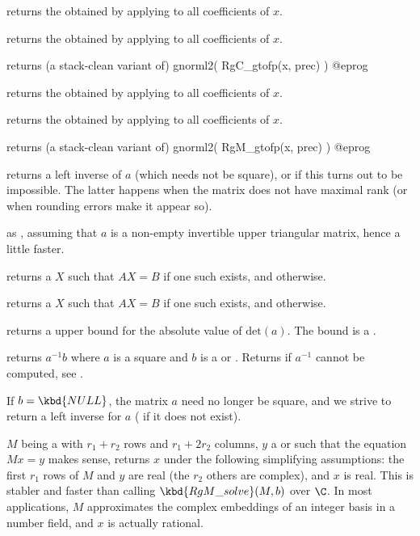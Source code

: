  returns the  obtained by
applying  to all coefficients of $x$.

 returns the  obtained by
applying  to all coefficients of $x$.

 returns (a stack-clean variant of)
\bprog
  gnorml2( RgC_gtofp(x, prec) )
@eprog

 returns the  obtained by
applying  to all coefficients of $x$.

 returns the  obtained by
applying  to all coefficients of $x$.

 returns (a stack-clean variant of)
\bprog
  gnorml2( RgM_gtofp(x, prec) )
@eprog


 returns a left inverse of $a$ (which needs not be
square), or  if this turns out to be impossible. The latter
happens when the matrix does not have maximal rank (or when rounding errors
make it appear so).

 as , assuming that $a$ is a
non-empty invertible upper triangular matrix, hence a little faster.

 returns a  $X$ such that
$A X = B$ if one such exists, and  otherwise.

 returns a  $X$ such that
$A X = B$ if one such exists, and  otherwise.

 returns a upper bound for the absolute
value of $\text{det}(a)$. The bound is a .

 returns $a^{-1}b$ where $a$ is a square
 and $b$ is a  or . Returns  if $a^{-1}$
cannot be computed, see .

If $b = \kbd{NULL}$, the matrix $a$ need no longer be square, and we strive
to return a left inverse for $a$ ( if it does not exist).

 $M$ being a 
with $r_1+r_2$ rows and $r_1+2r_2$ columns, $y$ a  or 
such that the equation $Mx = y$ makes sense, returns $x$ under the following
simplifying assumptions: the first $r_1$ rows of $M$ and $y$ are real
(the $r_2$ others are complex), and $x$ is real. This is stabler and faster
than calling $\kbd{RgM\_solve}(M, b)$ over $\C$. In most applications,
$M$ approximates the complex embeddings of an integer basis in a number
field, and $x$ is actually rational.

